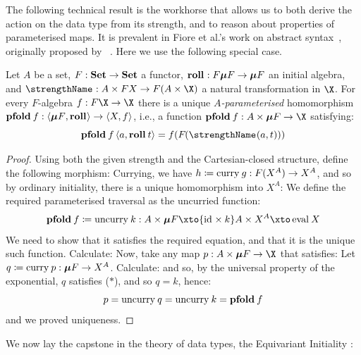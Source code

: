 The following technical result is the workhorse that allows us to both
derive the action on the data type from its strength, and to reason
about properties of parameterised maps. It is
prevalent in Fiore et al.'s work on abstract
syntax~\cite{fiore-szamozvancev:formal-soas,%
  fiore-szamozvancev:soas-theory,%
  fiore-ranchod:substructural-ast}, originally proposed by
\citeauthor{bird-paterson:generalised-folds-for-nested-datatypes}~\cite{%
  bird-paterson:generalised-folds-for-nested-datatypes}. Here we use
the following special case.

\begin{theorem}%
  Let $A$ be a set, $F : {\mathbf{ Set}} \to {\mathbf{ Set}}$ a functor, $\roll : F\fix F
  \to \fix F$ an initial algebra, and $\strength : A\times FX \to F(A
  \times \X)$ a natural transformation in $\X$. For every $F$-algebra
  $f : F\X \to \X$ there is a unique \emph{$A$-parameterised}
  homomorphism $\pfold f : \pair{\fix F}{\roll} \to \pair{X}{f}$, i.e., a
  function $\pfold f : A \times \fix F \to \X$ satisfying:
  \[
  \pfold f\pair a{\roll t} = f(\fmap(\strength(a,t)))
  \]
\end{theorem}
\begin{proof}%
  Using both the given strength and the Cartesian-closed structure,
  define the following morphism:
  Currying, we have $h \definedby \curry g : F(X^A) \to X^A$, and so
  by ordinary initiality, there is a unique homomorphism into $X^A$:
  We define the required parameterised traversal as the uncurried function:
  \[
  \pfold f \definedby \uncurry k :
  A \times \fix F \xto{\id \times k} A \times X^A \xto\eval X
  \]
  We need to show that it satisfies the required equation, and that it
  is the unique such function. Calculate:
  Now, take any map $p : A\times \fix F \to \X$ that satisfies:
  Let $q \definedby \curry p : \fix F \to X^A$. Calculate:
  and so, by the universal property of the exponential, $q$ satisfies
  ($*$), and so $q = k$, hence:
  \[
  p = \uncurry q = \uncurry k = \pfold f
  \]
  and we proved uniqueness.
\end{proof}

We now lay the capstone in the theory of data types, the Equivariant
Initiality :

